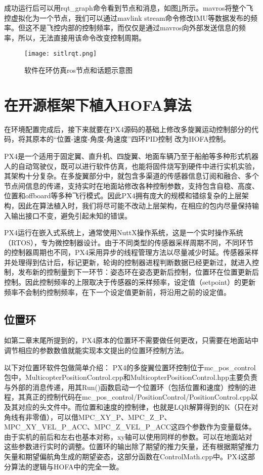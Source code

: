 成功运行后可以用rqt\_graph命令看到节点和消息，如图\ref{sitlrqt}所示。mavros将整个飞控虚拟化为一个节点，我们可以通过mavlink stream命令修改IMU等数据发布的频率。但这不是飞控内部的控制频率，而仅仅是通过mavros向外部发送信息的频率，所以，无法直接用该命令改变控制周期。
\begin{figure}[!h]
  \centering
  \texttt{[image: sitlrqt.png]}
  \caption{软件在环仿真ros节点和话题示意图}
  \label{sitlrqt}
\end{figure}

 \section{在开源框架下植入HOFA算法}
在环境配置完成后，接下来就要在PX4源码的基础上修改多旋翼运动控制部分的代码，将其原本的“位置-速度-角度-角速度”四环PID控制 \cite{px4}改为HOFA控制。

PX4是一个适用于固定翼、直升机、四旋翼、地面车辆乃至于船舶等多种形式机器人的自动驾驶仪，既可以进行软件仿真，也能将固件烧写到硬件中进行实机实验，其架构十分复杂。在多旋翼部分中，就包含多渠道的传感器信息订阅和融合、多个节点间信息的传递，支持实时在地面站修改各种控制参数，支持包含自稳、高度、位置和offboard等多种飞行模式。因此PX4拥有庞大的规模和错综复杂的上层架构，因此在算法植入时，我们将尽可能不改动上层架构，在相应的包内尽量保持输入输出接口不变，避免引起未知的错误。

PX4运行在嵌入式系统上，通常使用NuttX操作系统，这是一个实时操作系统（RTOS），专为微控制器设计。由于不同类型的传感器采样周期不同，不同环节的控制器周期也不同，PX4采用异步的线程管理方法以尽量减少时延。传感器采样并处理得到估计后，标记更新，轮询的控制器进程判断数据已经更新过，就进入控制，发布新的控制量到下一环节：姿态环在姿态更新后控制，位置环在位置更新后控制。因此控制频率的上限取决于传感器的采样频率，设定值（setpoint）的更新频率不会制约控制频率，在下一个设定值更新前，将沿用之前的设定值。

\subsection*{位置环}
如第二章末尾所提到的，PX4原本的位置环不需要做任何更改，只需要在地面站中调节相应的参数数值就能实现本文提出的位置环控制方法。

以下对位置环软件包做简单介绍：
PX4的多旋翼位置环控制位于mc\_pos\_control包中，MulticopterPositionControl.cpp和MulticopterPositionControl.hpp主要负责与外部的消息传递，用其Run()函数启动一个位置环（包括位置和速度）控制的进程，其真正的控制代码在mc\_pos\_control/PositionControl/PositionControl.cpp以及其对应的头文件中。而位置和速度的控制律，也就是LQR解算得到的K（只在对角线有非零值），可以借MPC\_XY\_P、MPC\_Z\_P、MPC\_XY\_VEL\_P\_ACC、MPC\_Z\_VEL\_P\_ACC这四个参数作为变量载体。由于实机的前后和左右也基本对称，xy轴可以使用同样的参数。可以在地面站对这些参数进行实时的调整。位置环的输出除了期望的推力矢量，还有根据期望推力矢量和期望偏航角生成的期望姿态，这部分函数在ControlMath.cpp中。PX4这部分算法的逻辑与HOFA中的完全一致。


